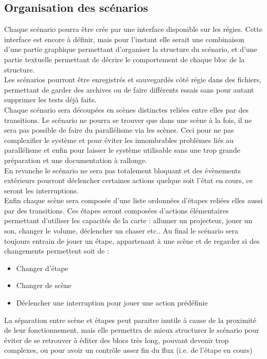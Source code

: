 \subsection{Organisation des scénarios}
Chaque scénario pourra être crée par une interface disponible sur les régies. Cette interface est encore à définir, mais pour l'instant elle serait une combinaison d'une partie graphique permettant d'organiser la structure du scénario, et d'une partie textuelle permettant de décrire le comportement de chaque bloc de la structure.\\
Les scénarios pourront être enregistrés et sauvegardés côté régie dans des fichiers, permettant de garder des archives ou de faire différents essais sans pour autant supprimer les tests déjà faits.\\
Chaque scénario sera découpées en scènes distinctes reliées entre elles par des transitions. \p
Le scénario ne pourra se trouver que dans une scène à la fois, il ne sera pas possible de faire du parallélisme via les scènes. Ceci pour ne pas complexifier le système et pour éviter les innombrables problèmes liés au parallélisme et enfin pour laisser le système utilisable sans une trop grande préparation et une documentation à rallonge.\\
En revanche le scénario ne sera pas totalement bloquant et des évènements extérieurs pourront déclencher certaines actions quelque soit l'état en cours, ce seront les interruptions.\\
Enfin chaque scène sera composée d'une liste ordonnées d'étapes reliées elles aussi par des transitions. Ces étapes seront composées d'actions élémentaires permettant d'utiliser les capacités de la carte : allumer un projecteur, jouer un son, changer le volume, déclencher un chaser etc..\p
Au final le scénario sera toujours entrain de jouer un étape, appartenant à une scène et de regarder si des changements permettent soit de :
\begin{itemize}
\item Changer d'étape
\item Changer de scène
\item Déclencher une interruption pour jouer une action prédéfinie
\end{itemize}
La séparation entre scène et étapes peut paraitre inutile à cause de la proximité de leur fonctionnement, mais elle permettra de mieux structurer le scénario pour éviter de se retrouver à éditer des blocs très long, pouvant devenir trop complexes, ou pour avoir un contrôle assez fin du flux (i.e. de l'étape en cours)

